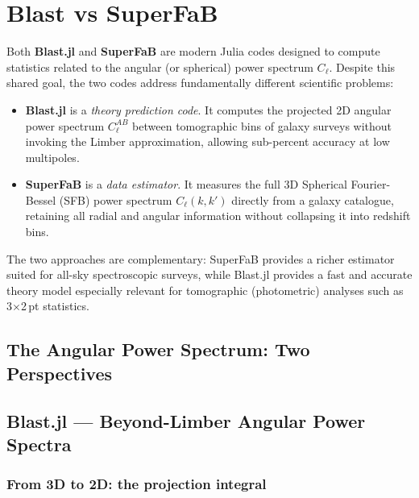 \section{Blast vs SuperFaB}

Both \textbf{Blast.jl} \cite{chiarenza2024blast} and \textbf{SuperFaB}
\cite{grasshorn2022superfab} are modern Julia codes designed to compute
statistics related to the angular (or spherical) power spectrum
$C_\ell$. Despite this shared goal, the two codes address fundamentally
different scientific problems:

\begin{itemize}
    \item \textbf{Blast.jl} is a \emph{theory prediction code}.
    It computes the projected 2D angular power spectrum
    $C_\ell^{AB}$ between tomographic bins of galaxy surveys without
    invoking the Limber approximation, allowing sub-percent accuracy
    at low multipoles.

    \item \textbf{SuperFaB} is a \emph{data estimator}. It measures
    the full 3D Spherical Fourier-Bessel (SFB) power spectrum
    $C_\ell(k, k')$ directly from a galaxy catalogue, retaining all
    radial and angular information without collapsing it into redshift
    bins.
\end{itemize}

The two approaches are complementary: SuperFaB provides a richer
estimator suited for all-sky spectroscopic surveys, while Blast.jl
provides a fast and accurate theory model especially relevant for
tomographic (photometric) analyses such as 3$\times$2\,pt statistics.

\subsection{The Angular Power Spectrum: Two Perspectives}

\subsection{Blast.jl --- Beyond-Limber Angular Power Spectra}

\subsubsection{From 3D to 2D: the projection integral}

